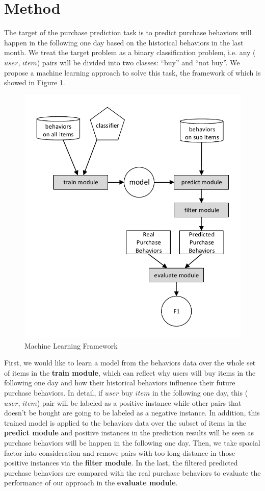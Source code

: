 \documentclass{llncs}
\begin{document}
\section{Method}
The target of the purchase prediction task is to predict purchase behaviors will happen
in the following one day based on the historical behaviors in the last month.
We treat the target problem as a binary classification problem,
i.e. any ($user$, $item$) pairs will be divided into two classes:
``buy'' and ``not buy''.
We propose a machine learning approach to solve this task,
the framework of which is showed in Figure \ref{fig:framework}.

\begin{figure}[htbp]
	\centering
	\includegraphics[scale=0.6]{images/system.pdf}
	\caption{Machine Learning Framework}
	\label{fig:framework}
\end{figure}

First, we would like to learn a model from
the behaviors data over the whole set of items in the \textbf{train module},
which can reflect why users will buy items in the following one day
and how their historical behaviors influence their future purchase behaviors.
In detail, if $user$ buy $item$ in the following one day,
this ($user$, $item$) pair will be labeled as a positive instance
while other pairs that doesn't be bought
are going to be labeled as a negative instance.
In addition, this trained model is applied to the behaviors data over
the subset of items in the \textbf{predict module}
and positive instances in the prediction results will be seen as
purchase behaviors will be happen in the following one day.
Then, we take spacial factor into consideration and remove pairs
with too long distance in those positive instances
via the \textbf{filter module}.
In the last, the filtered predicted purchase behaviors are
compared with the real purchase behaviors to evaluate
the performance of our approach in the \textbf{evaluate module}.
\end{document}
